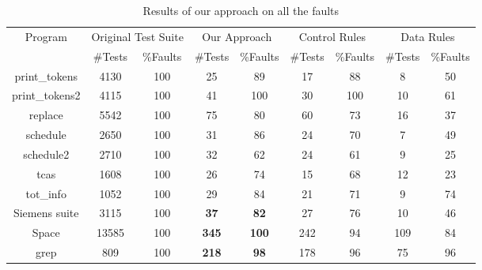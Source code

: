 \documentclass{sig-alternate}
\begin{document}

\begin{table}[htbp]
\caption{Results of our approach on all the faults}\label{tab:our}
\center
\begin{tabular}{|c|c|c|c|c|c|c|c|c|}
\hline Program   & \multicolumn{2}{c}{Original Test Suite} \vline & \multicolumn{2}{c}{Our Approach} \vline
& \multicolumn{2}{c}{Control Rules} \vline & \multicolumn{2}{c}{Data Rules} \vline   \\

\cline{2-9}   & \#Tests &   \%Faults & \#Tests &   \%Faults &
\#Tests &   \%Faults & \#Tests &   \%Faults \\
\hline  print\_tokens   &   4130    &   100 &   25  &   89  &   17  &   88  &   8   &   50  \\
\hline  print\_tokens2  &   4115    &   100 &   41  &   100 &   30  &   100 &   10  &   61  \\
\hline  replace &   5542    &   100 &   75  &   80  &   60  &   73  &   16  &   37  \\
\hline  schedule    &   2650    &   100 &   31  &   86  &   24  &   70  &   7   &   49  \\
\hline  schedule2   &   2710    &   100 &   32  &   62  &   24  &   61  &   9   &   25  \\
\hline  tcas    &   1608    &   100 &   26  &   74  &   15  &   68  &   12  &   23  \\
\hline  tot\_info &   1052    &   100 &   29  &   84  &   21  &   71  &   9   &   74  \\
\hline  Siemens suite   &   3115    &   100 &   \textbf{37}  &   \textbf{82}  &   27  &   76  &   10  &   46  \\
\hline  Space   &   13585   &   100 &   \textbf{345} &   \textbf{100} &   242 &   94  &   109 &   84  \\
\hline  grep    &   809 &   100 &   \textbf{218} &   \textbf{98}  &   178 &   96  &   75  &   96  \\

\hline
\end{tabular}
\end{table}
\end{document}
